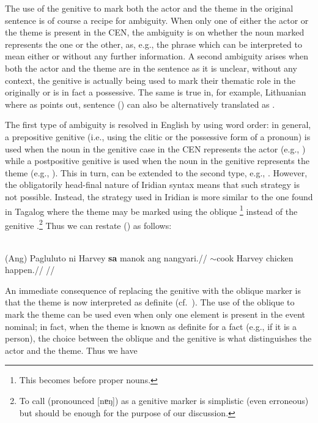 The use of the genitive to mark both the actor and the theme in the original sentence is of course a recipe for ambiguity. When only one of either the actor or the theme is present in the CEN, the ambiguity is on whether the noun marked represents the one or the other, as, e.g., the phrase  which can be interpreted to mean either  or  without any further information. A second ambiguity arises when both the actor and the theme are in the sentence as it is unclear, without any context, the genitive is actually being used to mark their thematic role in the originally or is in fact a possessive. The same is true in, for example, Lithuanian where as \textcite{serekaite2020} points out, sentence () can also be alternatively translated as .

The first type of ambiguity is resolved in English by using word order: in general, a prepositive genitive (i.e., using the clitic  or the possessive form of a pronoun) is used when the noun in the genitive case in the CEN represents the actor (e.g., ) while a postpositive genitive is used when the noun in the genitive represents the theme (e.g., ). This in turn, can be extended to the second type, e.g., . However, the obligatorily head-final nature of Iridian syntax means that such strategy is not possible. Instead, the strategy used in Iridian is more similar to the one found in Tagalog where the theme may be marked using the oblique \footnote{This becomes  before proper nouns.} instead of the genitive .\footnote{
    To call  (pronounced [nɐŋ]) as a genitive marker is simplistic (even erroneous) but should be enough for the purpose of our discussion.
} Thus we can restate () as follows:

\\
\begingl
    \gla (Ang) Pagluluto ni Harvey \textbf{sa} manok ang nangyari.//
    \glb \Nom{} \Ger{}$\sim$cook \Gen{} Harvey \Obl{} chicken \Nom{} happen.\Pfv{}//
    \glft {}//
\endgl
\xe

An immediate consequence of replacing the genitive  with the oblique marker  is that the theme is now interpreted as definite (cf.~\cite[3,\,40]{kaufman2009}). The use of the oblique to mark the theme can be used even when only one element is present in the event nominal; in fact, when the theme is known as definite for a fact (e.g., if it is a person), the choice between the oblique and the genitive is what distinguishes the actor and the theme. Thus we have

